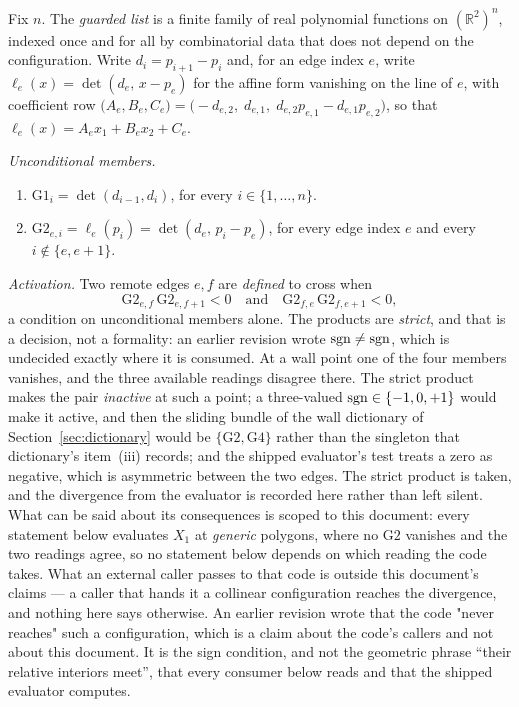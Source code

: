 \begin{definition}\label{def:guarded}
Fix $n$. The \emph{guarded list} is a finite family of real polynomial functions
on $(\mathbb R^2)^n$, indexed once and for all by combinatorial data that does
not depend on the configuration. Write $d_i=p_{i+1}-p_i$ and, for an edge index
$e$, write $\ell_e(x)=\det(d_e,\,x-p_e)$ for the affine form vanishing on the
line of $e$, with coefficient row
$\bigl(A_e,B_e,C_e\bigr)=\bigl(-d_{e,2},\;d_{e,1},\;d_{e,2}p_{e,1}-d_{e,1}p_{e,2}\bigr)$,
so that $\ell_e(x)=A_ex_1+B_ex_2+C_e$.

\emph{Unconditional members.}
\begin{enumerate}
\item[(G1)] $\mathrm{G1}_i=\det(d_{i-1},d_i)$, for every $i\in\{1,\dots,n\}$.
\item[(G2)] $\mathrm{G2}_{e,i}=\ell_e(p_i)=\det(d_e,\,p_i-p_e)$, for every edge
index $e$ and every $i\notin\{e,e+1\}$.
\end{enumerate}

\emph{Activation.} Two remote edges $e,f$ are \emph{defined} to cross when
\[
   \mathrm{G2}_{e,f}\,\mathrm{G2}_{e,f+1}<0
   \quad\text{and}\quad
   \mathrm{G2}_{f,e}\,\mathrm{G2}_{f,e+1}<0 ,
\]
a condition on unconditional members alone. The products are \emph{strict}, and
that is a decision, not a formality: an earlier revision wrote
$\operatorname{sgn}\neq\operatorname{sgn}$, which is undecided exactly where it is consumed. At a wall
point one of the four members vanishes, and the three available readings
disagree there. The strict product makes the pair \emph{inactive} at such a
point; a three-valued $\operatorname{sgn}\in\{-1,0,+1\}$ would make it active, and then the
sliding bundle of the wall dictionary of
Section~\ref{sec:dictionary} would be $\{\mathrm{G2},\mathrm{G4}\}$ rather than
the singleton that dictionary's item~(iii) records;
and the shipped evaluator's test treats a zero as negative, which is asymmetric
between the two edges. The strict product is taken, and the divergence from the
evaluator is recorded here rather than left silent. What can be said about its
consequences is scoped to this document: every statement below evaluates $X_1$
at \emph{generic} polygons, where no $\mathrm{G2}$ vanishes and the two
readings agree, so no statement below depends on which reading the code takes.
What an external caller passes to that code is outside this document's claims
--- a caller that hands it a collinear configuration reaches the divergence, and
nothing here says otherwise. An earlier revision wrote that the code "never
reaches" such a configuration, which is a claim about the code's callers and not
about this document. It is the sign
condition, and not the geometric phrase ``their relative interiors meet'', that
every consumer below reads and that the shipped evaluator computes.


\end{definition}
